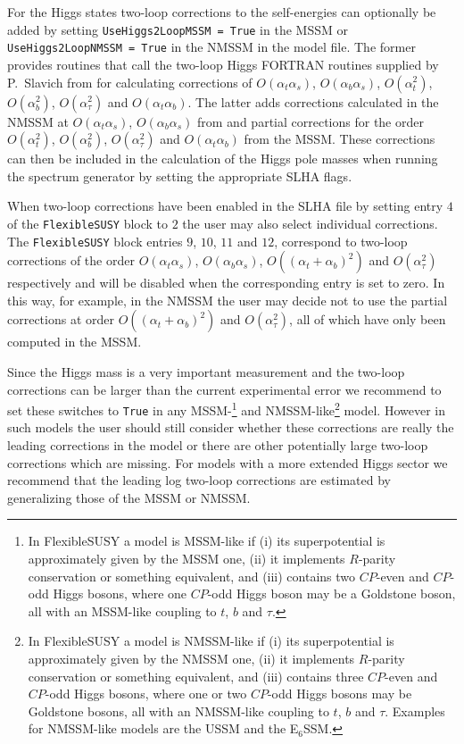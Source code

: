 \documentclass[final,3p,11pt,pdflatex]{elsarticle}
\makeatletter
\newcommand{\fs}{FlexibleSUSY\@\xspace}
\newcommand{\ESSM}{E$_6$SSM\@\xspace}
\newcommand{\code}[1]{\lstinline|#1|}  %
\def\at{\alpha_t}
\def\ab{\alpha_b}
\def\as{\alpha_s}
\def\atau{\alpha_{\tau}}
\def\oatab{O(\at\ab)}
\def\oatas{O(\at\as)}
\def\oabas{O(\ab\as)}
\def\oatq{O(\at^2)}
\def\oabq{O(\ab^2)}
\def\oatauq{O(\atau^2)}
\def\oatplusabsq{O((\at+\ab)^2)}
\makeatother
\begin{document}
For the Higgs states two-loop corrections to the self-energies can
optionally be added by setting \code{UseHiggs2LoopMSSM = True} in the
MSSM or \code{UseHiggs2LoopNMSSM = True} in the NMSSM in the model
file.  The former provides routines that call the two-loop Higgs
FORTRAN routines supplied by P.~Slavich from
\cite{Degrassi:2001yf,Brignole:2001jy,Dedes:2002dy,Brignole:2002bz,Dedes:2003km}
for calculating corrections of $\oatas$, $\oabas$, $\oatq$, $\oabq$,
$\oatauq$ and $\oatab$.  The latter adds corrections calculated in the
NMSSM at $\oatas$, $\oabas$ from \cite{Degrassi:2009yq} and partial
corrections for the order $\oatq$, $\oabq$, $\oatauq$ and $\oatab$
from the MSSM.  These corrections can then be included in the
calculation of the Higgs pole masses when running the spectrum
generator by setting the appropriate SLHA flags.

When two-loop corrections have been enabled in the SLHA file by
setting entry $4$ of the \code{FlexibleSUSY} block to $2$ the user may
also select individual corrections.  The \code{FlexibleSUSY} block
entries $9$, $10$, $11$ and $12$, correspond to two-loop corrections
of the order $\oatas$, $\oabas$, $\oatplusabsq$ and $\oatauq$
respectively and will be disabled when the corresponding entry is set
to zero.  In this way, for example, in the NMSSM the user may decide
not to use the partial corrections at order $\oatplusabsq$ and
$\oatauq$, all of which have only been computed in the MSSM.

Since the Higgs mass is a very important measurement and the two-loop
corrections can be larger than the current experimental error
\cite{Degrassi:2009yq} we recommend to set these switches to
\code{True} in any MSSM-\footnote{In \fs a model is MSSM-like if (i)
  its superpotential is approximately given by the MSSM one, (ii) it
  implements $R$-parity conservation or something equivalent, and
  (iii) contains two $CP$-even and $CP$-odd Higgs bosons, where one $CP$-odd
  Higgs boson may be a Goldstone boson, all with an MSSM-like coupling
  to $t$, $b$ and $\tau$.} and NMSSM-like\footnote{In \fs a model is
  NMSSM-like if (i) its superpotential is approximately given by the
  NMSSM one, (ii) it implements $R$-parity conservation or something
  equivalent, and (iii) contains three $CP$-even and $CP$-odd Higgs
  bosons, where one or two $CP$-odd Higgs bosons may be Goldstone
  bosons, all with an NMSSM-like coupling to $t$, $b$ and $\tau$\@.
  Examples for NMSSM-like models are the USSM and the \ESSM.} model.
However in such models the user should still consider whether these
corrections are really the leading corrections in the model or %
there are other potentially large two-loop corrections which are
missing.  For models with a more extended Higgs sector we recommend
that the leading log two-loop corrections are estimated by
generalizing those of the MSSM or NMSSM.
\end{document}
